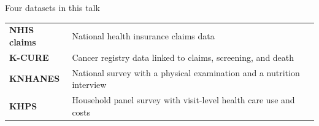\documentclass[aspectratio=169,11pt]{beamer}
\newcommand{\hl}[1]{\textbf{\color{kdgreen}#1}}
\begin{document}
\begin{frame}{Four datasets in this talk}
  \vspace{2pt}
  \renewcommand{\arraystretch}{1.5}
  \begin{tabularx}{\textwidth}{@{}l>{\raggedright\arraybackslash}X@{}}
    \toprule
    \hl{NHIS claims} & National health insurance claims data \\
    \hl{K-CURE} & Cancer registry data linked to claims, screening,
      and death \\
    \hl{KNHANES} & National survey with a physical examination and a
      nutrition interview \\
    \hl{KHPS} & Household panel survey with
      visit-level health care use and costs \\
    \bottomrule
  \end{tabularx}
  \vspace{8pt}

\end{frame}
\end{document}
